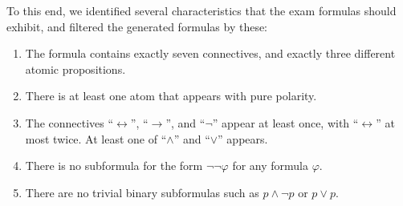 To this end,
we identified several characteristics that the exam formulas should exhibit,
and filtered the generated formulas by these:
%
\begin{enumerate}
    \item
        The formula contains exactly seven connectives,
        and exactly three different atomic propositions.
    \item\label{item:polarity}
        There is at least one atom that appears with pure polarity.
    \item
        The connectives ``$\leftrightarrow$'', ``$\rightarrow$'', and ``$\lnot$'' appear at least once,
        with ``$\leftrightarrow$'' at most twice.
        At least one of ``$\land$'' and ``$\lor$'' appears.
    \item
        There is no subformula for the form $\lnot \lnot \varphi$ for any formula $\varphi$.
    \item
        There are no trivial binary subformulas such as $p \land \lnot p$ or $p \lor p$.

\end{enumerate}
